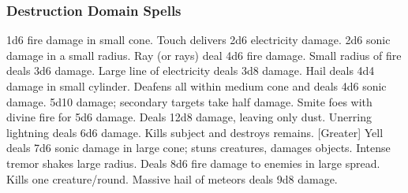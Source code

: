 \subsubsection{Destruction Domain Spells}

\begin{spelllist}
     1d6 fire damage in small cone.
     Touch delivers 2d6 electricity damage.
     2d6 sonic damage in a small radius.
     Ray (or rays) deal 4d6 fire damage.
     Small radius of fire deals 3d6 damage.
     Large line of electricity deals 3d8 damage.
     Hail deals 4d4 damage in small cylinder.
     Deafens all within medium cone and deals 4d6 sonic damage.
     5d10 damage; secondary targets take half damage.
     Smite foes with divine fire for 5d6 damage.
     Deals 12d8 damage, leaving only dust.
     Unerring lightning deals 6d6 damage.
    \F Kills subject and destroys remains.
    [Greater] Yell deals 7d6 sonic damage in large cone; stuns creatures, damages objects.
     Intense tremor shakes large radius.
     Deals 8d6 fire damage to enemies in large spread.
     Kills one creature/round.
     Massive hail of meteors deals 9d8 damage.
\end{spelllist}

